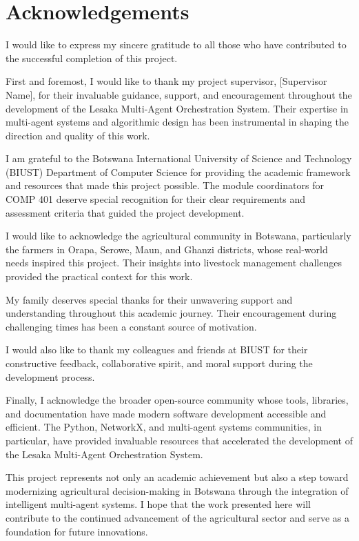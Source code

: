 
\chapter*{Acknowledgements}

I would like to express my sincere gratitude to all those who have contributed to the successful completion of this project.

First and foremost, I would like to thank my project supervisor, [Supervisor Name], for their invaluable guidance, support, and encouragement throughout the development of the Lesaka Multi-Agent Orchestration System. Their expertise in multi-agent systems and algorithmic design has been instrumental in shaping the direction and quality of this work.

I am grateful to the Botswana International University of Science and Technology (BIUST) Department of Computer Science for providing the academic framework and resources that made this project possible. The module coordinators for COMP 401 deserve special recognition for their clear requirements and assessment criteria that guided the project development.

I would like to acknowledge the agricultural community in Botswana, particularly the farmers in Orapa, Serowe, Maun, and Ghanzi districts, whose real-world needs inspired this project. Their insights into livestock management challenges provided the practical context for this work.

My family deserves special thanks for their unwavering support and understanding throughout this academic journey. Their encouragement during challenging times has been a constant source of motivation.

I would also like to thank my colleagues and friends at BIUST for their constructive feedback, collaborative spirit, and moral support during the development process.

Finally, I acknowledge the broader open-source community whose tools, libraries, and documentation have made modern software development accessible and efficient. The Python, NetworkX, and multi-agent systems communities, in particular, have provided invaluable resources that accelerated the development of the Lesaka Multi-Agent Orchestration System.

This project represents not only an academic achievement but also a step toward modernizing agricultural decision-making in Botswana through the integration of intelligent multi-agent systems. I hope that the work presented here will contribute to the continued advancement of the agricultural sector and serve as a foundation for future innovations.
